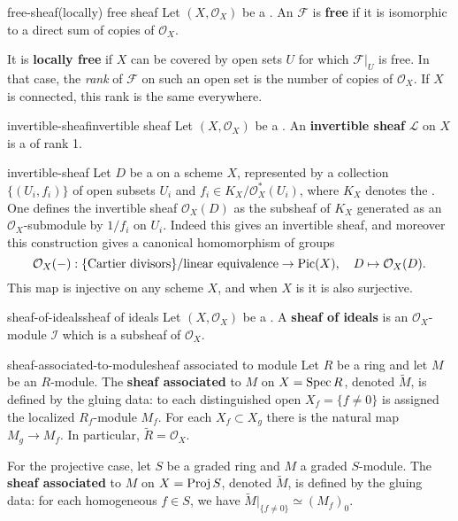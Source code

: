 \begin{topic}{free-sheaf}{(locally) free sheaf}
    Let $(X, \mathcal{O}_X)$ be a . An  $\mathcal{F}$ is \textbf{free} if it is isomorphic to a direct sum of copies of $\mathcal{O}_X$.
    
    It is \textbf{locally free} if $X$ can be covered by open sets $U$ for which $\mathcal{F}|_U$ is free. In that case, the \textit{rank} of $\mathcal{F}$ on such an open set is the number of copies of $\mathcal{O}_X$. If $X$ is connected, this rank is the same everywhere.
\end{topic}

\begin{topic}{invertible-sheaf}{invertible sheaf}
    Let $(X, \mathcal{O}_X)$ be a . An \textbf{invertible sheaf} $\mathcal{L}$ on $X$ is a   of rank 1.
\end{topic}

\begin{example}{invertible-sheaf}
    Let $D$ be a  on a scheme $X$, represented by a collection $\{ (U_i, f_i) \}$ of open subsets $U_i$ and $f_i \in K_X / \mathcal{O}_X^* (U_i)$, where $K_X$ denotes the . One defines the invertible sheaf $\mathcal{O}_X(D)$ as the subsheaf of $K_X$ generated as an $\mathcal{O}_X$-submodule by $1/f_i$ on $U_i$. Indeed this gives an invertible sheaf, and moreover this construction gives a canonical homomorphism of groups
    \[ \mathcal{O}_X(-) : \{ \textup{Cartier divisors} \} / \textup{linear equivalence} \to \textup{Pic}(X), \quad D \mapsto \mathcal{O}_X(D) . \]
    This map is injective on any scheme $X$, and when $X$ is  it is also surjective.
\end{example}

\begin{topic}{sheaf-of-ideals}{sheaf of ideals}
    Let $(X, \mathcal{O}_X)$ be a . A \textbf{sheaf of ideals} is an $\mathcal{O}_X$-module $\mathcal{I}$ which is a subsheaf of $\mathcal{O}_X$.
\end{topic}

\begin{topic}{sheaf-associated-to-module}{sheaf associated to module}
    Let $R$ be a ring and let $M$ be an $R$-module. The \textbf{sheaf associated} to $M$ on $X = \operatorname{Spec} R$, denoted $\tilde{M}$, is defined by the gluing data: to each distinguished open $X_f = \{ f \ne 0 \}$ is assigned the localized $R_f$-module $M_f$. For each $X_f \subset X_g$ there is the natural map $M_g \to M_f$. In particular, $\tilde{R} = \mathcal{O}_X$.
    
    For the projective case, let $S$ be a graded ring and $M$ a graded $S$-module. The \textbf{sheaf associated} to $M$ on $X = \operatorname{Proj} S$, denoted $\tilde{M}$, is defined by the gluing data: for each homogeneous $f \in S$, we have $\tilde{M}|_{\{ f \ne 0\}} \simeq (M_f)_0$.
\end{topic}

